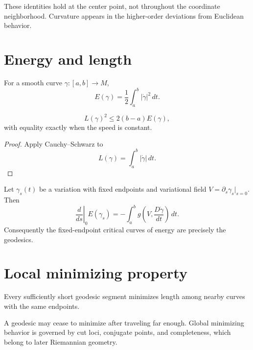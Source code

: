 \begin{remark}
These identities hold at the center point, not throughout the coordinate
neighborhood.  Curvature appears in the higher-order deviations from Euclidean
behavior.
\end{remark}

\section{Energy and length}

\begin{definition}[Energy]\label{def:vii23-energy}
For a smooth curve \(\gamma:[a,b]\to M\),
\[
E(\gamma)
=
\frac12\int_a^b|\dot\gamma|^2\,dt.
\]
\end{definition}

\begin{proposition}\label{prop:vii23-energy-length}
\[
L(\gamma)^2
\le
2(b-a)E(\gamma),
\]
with equality exactly when the speed is constant.
\end{proposition}

\begin{proof}
Apply Cauchy--Schwarz to
\[
L(\gamma)=\int_a^b|\dot\gamma|\,dt.
\]
\end{proof}

\begin{theorem}\label{thm:vii23-first-variation}
Let \(\gamma_s(t)\) be a variation with fixed endpoints and variational field
\(V=\partial_s\gamma_s|_{s=0}\). Then
\[
\left.\frac d{ds}\right|_{0}E(\gamma_s)
=
-\int_a^b
g\!\left(V,\frac{D\dot\gamma}{dt}\right)\,dt.
\]
Consequently the fixed-endpoint critical curves of energy are precisely the
geodesics.
\end{theorem}

\section{Local minimizing property}

\begin{theorem}\label{thm:vii23-local-min}
Every sufficiently short geodesic segment minimizes length among nearby curves
with the same endpoints.
\end{theorem}

\begin{warning}\label{warn:vii23-global}
A geodesic may cease to minimize after traveling far enough.  Global minimizing
behavior is governed by cut loci, conjugate points, and completeness, which belong
to later Riemannian geometry.
\end{warning}

